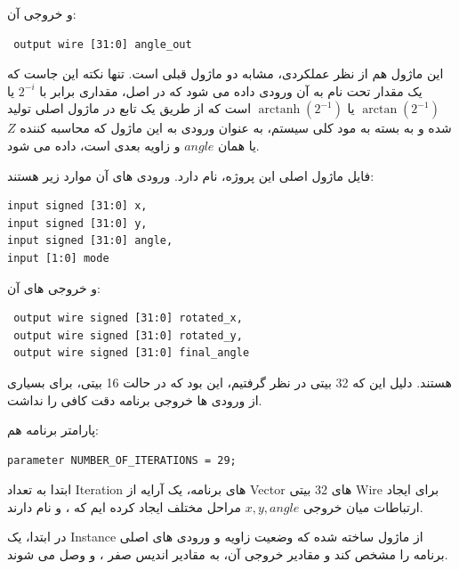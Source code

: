\documentclass[12pt,titlepage,a4page , tikz , multi,table , svgnames,xcdraw]{article}
\DeclareMathOperator\arctanh{arctanh}
\begin{document}
و خروجی آن:

\begin{latin}
\begin{verbatim}
 output wire [31:0] angle_out
\end{verbatim}
\end{latin}

این ماژول هم از نظر عملکردی، مشابه دو ماژول قبلی است. تنها نکته این جاست که یک مقدار تحت نام  به آن ورودی داده می شود که در اصل، مقداری برابر با $2^{-i}$ یا $\arctan (2^{-1})$ یا
$\arctanh (2^{-1})$
است که از طریق یک تابع در ماژول اصلی تولید شده و به بسته به مود کلی سیستم، به عنوان ورودی به این ماژول که محاسبه کننده $Z$ یا همان $angle$ و زاویه بعدی است، داده می شود.

\hrulefill

فایل ماژول اصلی این پروژه،  نام دارد. ورودی های آن موارد زیر هستند:

\begin{latin}
\begin{verbatim}
input signed [31:0] x,
input signed [31:0] y,
input signed [31:0] angle,
input [1:0] mode
\end{verbatim}
\end{latin}

و خروجی های آن:

\begin{latin}
\begin{verbatim}
 output wire signed [31:0] rotated_x,
 output wire signed [31:0] rotated_y,
 output wire signed [31:0] final_angle
\end{verbatim}
\end{latin}

هستند. دلیل این که 32 بیتی در نظر گرفتیم، این بود که در حالت 16 بیتی، برای بسیاری از ورودی ها خروجی برنامه دقت کافی را نداشت.

پارامتر برنامه هم:

\begin{latin}
\begin{verbatim}
parameter NUMBER_OF_ITERATIONS = 29;
\end{verbatim}
\end{latin}


ابتدا به تعداد Iteration های برنامه، یک آرایه از Vector های 32 بیتی Wire برای ایجاد ارتباطات میان خروجی $x,y,angle$ مراحل مختلف ایجاد کرده ایم که ،  و  نام دارند.

در ابتدا، یک Instance از ماژول  ساخته شده که وضعیت زاویه و ورودی های اصلی برنامه را مشخص کند و مقادیر خروجی آن، به مقادیر اندیس صفر  ،  و  وصل می شوند.
\end{document}

